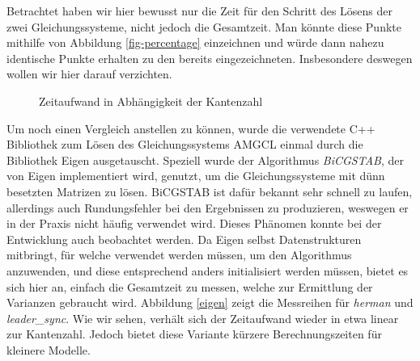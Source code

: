 \documentclass[a4paper]{article}
\theoremstyle{nonumberplain}
\begin{document}
Betrachtet haben wir hier bewusst nur die Zeit für den Schritt des Lösens der zwei Gleichungssysteme, nicht jedoch die Gesamtzeit. Man könnte diese Punkte mithilfe von Abbildung \ref{fig-percentage} einzeichnen und würde dann nahezu identische Punkte erhalten zu den bereits eingezeichneten. Insbesondere deswegen wollen wir hier darauf verzichten.


\begin{figure}
	\caption{Zeitaufwand in Abhängigkeit der Kantenzahl}
	\label{fig-in-edges1}
	\centering
\end{figure}

Um noch einen Vergleich anstellen zu können, wurde die verwendete C++ Bibliothek zum Lösen des Gleichungssystems AMGCL einmal durch die Bibliothek Eigen ausgetauscht. Speziell wurde der Algorithmus \textit{BiCGSTAB}, der von Eigen implementiert wird, genutzt, um die Gleichungssysteme mit dünn besetzten Matrizen zu lösen. BiCGSTAB ist dafür bekannt sehr schnell zu laufen, allerdings auch Rundungsfehler bei den Ergebnissen zu produzieren, weswegen er in der Praxis nicht häufig verwendet wird. Dieses Phänomen konnte bei der Entwicklung auch beobachtet werden. Da Eigen selbst Datenstrukturen mitbringt, für welche verwendet werden müssen, um den Algorithmus anzuwenden, und diese entsprechend anders initialisiert werden müssen, bietet es sich hier an, einfach die Gesamtzeit zu messen, welche zur Ermittlung der Varianzen gebraucht wird. Abbildung \ref{eigen} zeigt die Messreihen für \textit{herman} und \textit{leader\_sync}. Wie wir sehen, verhält sich der Zeitaufwand wieder in etwa linear zur Kantenzahl. Jedoch bietet diese Variante kürzere Berechnungszeiten für kleinere Modelle.
\end{document}
